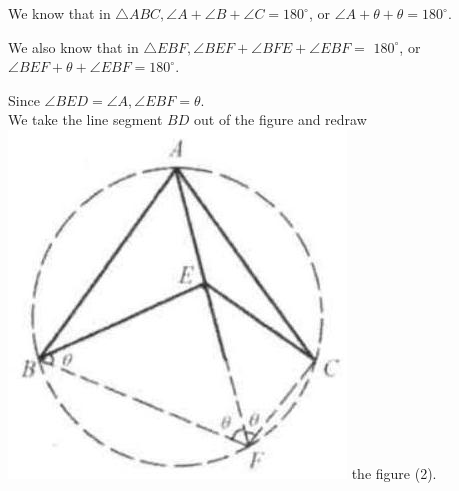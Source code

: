 \documentclass[10pt]{article}
\begin{document}
We know that in \(\triangle A B C, \angle A+\angle B+\angle C=180^{\circ}\), or \(\angle A+\theta+\theta=180^{\circ}\).

We also know that in \(\triangle E B F, \angle B E F+\angle B F E+\angle E B F=\) \(180^{\circ}\), or \(\angle B E F+\theta+\angle E B F=180^{\circ}\).

Since \(\angle B E D=\angle A, \angle E B F=\theta\).\\
We take the line segment \(B D\) out of the figure and redraw\\
\includegraphics[max width=\textwidth]{2025_04_17_97bc1f7e44d93c271a88g-202(1)} the figure (2).
\end{document}
